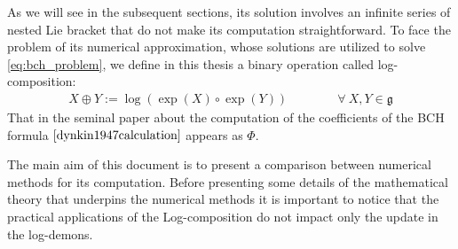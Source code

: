 As we will see in the subsequent sections, its solution involves an infinite series of nested Lie bracket that do not make its computation straightforward. 
To face the problem of its numerical approximation, whose solutions are utilized to solve \ref{eq:bch_problem}, we define in this thesis a binary operation called log-composition:
\begin{align*}
X \oplus Y := \log(\exp(X)\circ\exp( Y))
\qquad \qquad
\forall ~X, Y \in \mathfrak{g}
\end{align*}
That in the seminal paper about the computation of the coefficients of the BCH formula $\cite{dynkin1947calculation}$ appears as $\Phi$.

The main aim of this document is to present a comparison between numerical methods for its computation.
Before presenting some details of the mathematical theory that underpins the numerical methods it is important to notice that the practical applications of the Log-composition do not impact only the update in the log-demons.

